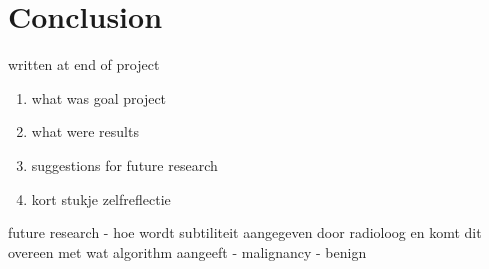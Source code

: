 \section{Conclusion}
written at end of project

\begin{enumerate}
\item what was goal project
\item what were results
\item suggestions for future research
\item kort stukje zelfreflectie
\end{enumerate}

future research
- hoe wordt subtiliteit aangegeven door radioloog en komt dit overeen met wat
algorithm aangeeft
- malignancy - benign
